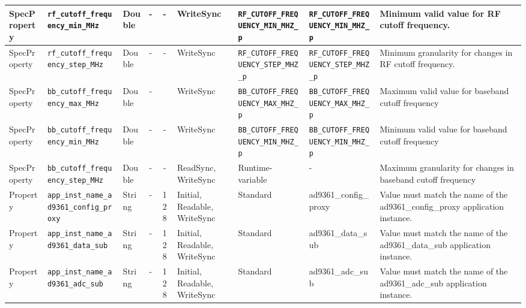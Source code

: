 \begin{landscape}
\begin{scriptsize}
\begin{longtable}{|p{1.8cm}|p{4.1cm}|p{1cm}|c|c|p{1.6cm}|p{3.7cm}|p{3.7cm}|p{2.5cm}|}
			\hline
			SpecProperty & \verb+rf_cutoff_frequency_min_MHz+  & Double& -        & -          & WriteSync      & \verb+RF_CUTOFF_FREQUENCY_MIN_MHZ_p+ & \verb+RF_CUTOFF_FREQUENCY_MIN_MHZ_p+  & Minimum valid value for RF cutoff frequency. \\
			\hline
			SpecProperty & \verb+rf_cutoff_frequency_step_MHz+ & Double& -        & -          & WriteSync      & \verb+RF_CUTOFF_FREQUENCY_STEP_MHZ_p+ & \verb+RF_CUTOFF_FREQUENCY_STEP_MHZ_p+ & Minimum granularity for changes in RF cutoff frequency. \\
			\hline
			SpecProperty & \verb+bb_cutoff_frequency_max_MHz+  & Double& -        & & WriteSync      & \verb+BB_CUTOFF_FREQUENCY_MAX_MHZ_p+ & \verb+BB_CUTOFF_FREQUENCY_MAX_MHZ_p+ & Maximum valid value for baseband cutoff frequency                                                                                                                                                                           \\
			\hline
			SpecProperty & \verb+bb_cutoff_frequency_min_MHz+  & Double& -        & -          & WriteSync      & \verb+BB_CUTOFF_FREQUENCY_MIN_MHZ_p+ & \verb+BB_CUTOFF_FREQUENCY_MIN_MHZ_p+ & Minimum valid value for baseband cutoff frequency                                                                                                                                                                           \\
			\hline
			SpecProperty & \verb+bb_cutoff_frequency_step_MHz+ & Double& -        & -          & ReadSync, WriteSync & Runtime-variable & - & Maximum granularity for changes in baseband cutoff frequency                                                                                                                                                                \\
			\hline
			Property & \verb+app_inst_name_ad9361_config_proxy+ &String& -        & 128        & Initial, Readable, WriteSync & Standard & ad9361\_config\_proxy & Value must match the name of the ad9361\_config\_proxy application instance. \\
			\hline
			Property & \verb+app_inst_name_ad9361_data_sub+ &String& -        & 128        & Initial, Readable, WriteSync & Standard & ad9361\_data\_sub & Value must match the name of the ad9361\_data\_sub application instance. \\
			\hline
			Property & \verb+app_inst_name_ad9361_adc_sub+ &String& -        & 128        & Initial, Readable, WriteSync & Standard & ad9361\_adc\_sub & Value must match the name of the ad9361\_adc\_sub application instance. \\

\end{longtable}
\end{scriptsize}
\end{landscape}
